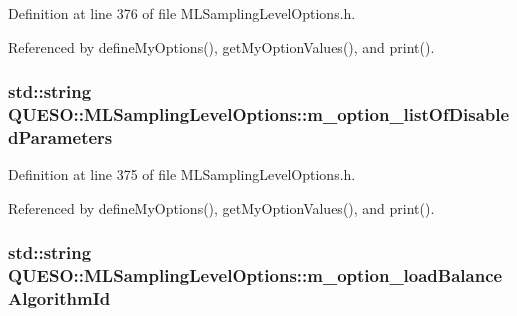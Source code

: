 Definition at line 376 of file M\-L\-Sampling\-Level\-Options.\-h.



Referenced by define\-My\-Options(), get\-My\-Option\-Values(), and print().

\hypertarget{class_q_u_e_s_o_1_1_m_l_sampling_level_options_a296043cd6f00282ccf1a39e219aa16ef}{
\subsubsection[{m\-\_\-option\-\_\-list\-Of\-Disabled\-Parameters}]{\setlength{\rightskip}{0pt plus 5cm}std\-::string Q\-U\-E\-S\-O\-::\-M\-L\-Sampling\-Level\-Options\-::m\-\_\-option\-\_\-list\-Of\-Disabled\-Parameters\hspace{0.3cm}{\ttfamily [private]}}}\label{class_q_u_e_s_o_1_1_m_l_sampling_level_options_a296043cd6f00282ccf1a39e219aa16ef}


Definition at line 375 of file M\-L\-Sampling\-Level\-Options.\-h.



Referenced by define\-My\-Options(), get\-My\-Option\-Values(), and print().

\hypertarget{class_q_u_e_s_o_1_1_m_l_sampling_level_options_aad6ce1095a38c062d5f1d9ca9e215671}{
\subsubsection[{m\-\_\-option\-\_\-load\-Balance\-Algorithm\-Id}]{\setlength{\rightskip}{0pt plus 5cm}std\-::string Q\-U\-E\-S\-O\-::\-M\-L\-Sampling\-Level\-Options\-::m\-\_\-option\-\_\-load\-Balance\-Algorithm\-Id\hspace{0.3cm}{\ttfamily [private]}}}\label{class_q_u_e_s_o_1_1_m_l_sampling_level_options_aad6ce1095a38c062d5f1d9ca9e215671}


